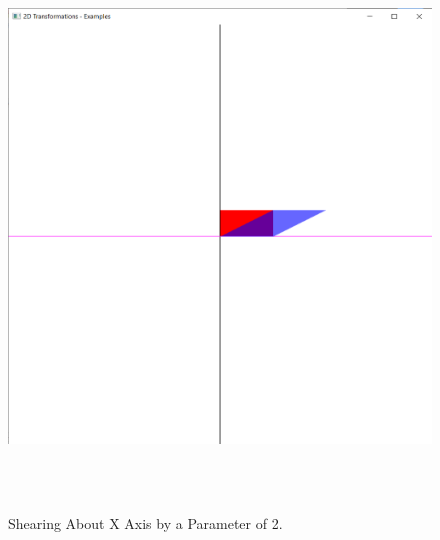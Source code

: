 \documentclass[12pt, a4]{article}
\begin{document}
\subsection*{}
\begin{figure}[h]
\centering
\caption{Shearing About X Axis by a Parameter of 2.}
\includegraphics[height=15cm, width=15cm]{Outputs/Output-12.png}
\end{figure}

\newpage
\end{document}
